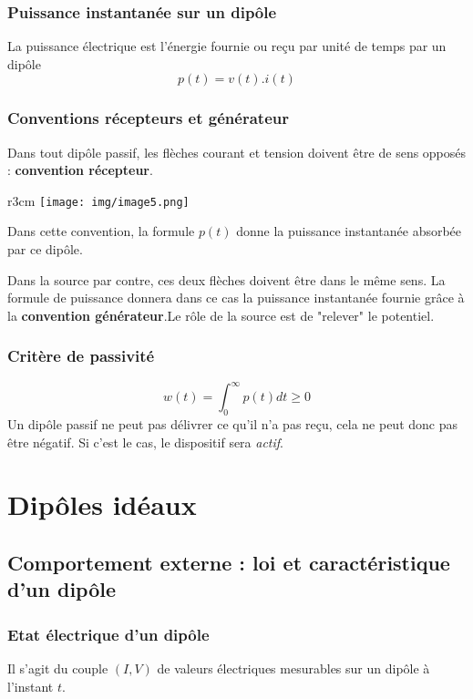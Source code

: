 \documentclass[11pt, a4paper, openany]{book}
\begin{document}
		\subsection{Puissance instantanée sur un dipôle}
		La puissance électrique est l'énergie fournie ou reçu par unité de temps par un dipôle
		\begin{equation}
		p(t) = v(t).i(t)
		\end{equation}
		
		\subsection{Conventions récepteurs et générateur}
		Dans tout dipôle passif, les flèches courant et tension doivent être de sens opposés : \textbf{convention récepteur}.\\
		\begin{wrapfigure}[8]{r}{3cm}
			\texttt{[image: img/image5.png]}
		\end{wrapfigure} Dans cette convention, la formule $p(t)$ donne la puissance instantanée absorbée par ce dipôle.
		
		Dans la source par contre, ces deux flèches doivent être dans le même sens. La formule de puissance donnera dans ce cas la puissance instantanée fournie grâce à la \textbf{convention générateur}.Le rôle de la source est de "relever" le potentiel.
		
		\subsection{Critère de passivité}
		\begin{equation}
		w(t) = \int_0^\infty p(t)dt \geq 0
		\end{equation}
		Un dipôle passif ne peut pas délivrer ce qu'il n'a pas reçu, cela ne peut donc pas être négatif. Si c'est le cas, le dispositif sera \textit{actif}.
		
		\chapter{Dipôles idéaux}
		
		\section{Comportement externe : loi et caractéristique d'un dipôle}
		\subsection{Etat électrique d'un dipôle}
		Il s'agit du couple $(I,V)$ de valeurs électriques mesurables sur un dipôle à l'instant $t$.
		
\end{document}
